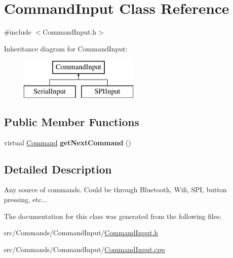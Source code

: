 \hypertarget{classCommandInput}{}\section{Command\+Input Class Reference}
\label{classCommandInput}


{\ttfamily \#include $<$Command\+Input.\+h$>$}

Inheritance diagram for Command\+Input\+:\begin{figure}[H]
\begin{center}
\leavevmode
\includegraphics[height=2.000000cm]{classCommandInput}
\end{center}
\end{figure}
\subsection*{Public Member Functions}
\begin{DoxyCompactItemize}
\item 
\hypertarget{classCommandInput_adde08e78426afd0f6b8fd7274c08f289}{}virtual \hyperlink{classCommand}{Command} {\bfseries get\+Next\+Command} ()\label{classCommandInput_adde08e78426afd0f6b8fd7274c08f289}

\end{DoxyCompactItemize}


\subsection{Detailed Description}
Any source of commands. Could be through Bluetooth, Wifi, S\+P\+I, button pressing, etc... 

The documentation for this class was generated from the following files\+:\begin{DoxyCompactItemize}
\item 
src/\+Commands/\+Command\+Input/\hyperlink{CommandInput_8h}{Command\+Input.\+h}\item 
src/\+Commands/\+Command\+Input/\hyperlink{CommandInput_8cpp}{Command\+Input.\+cpp}\end{DoxyCompactItemize}
